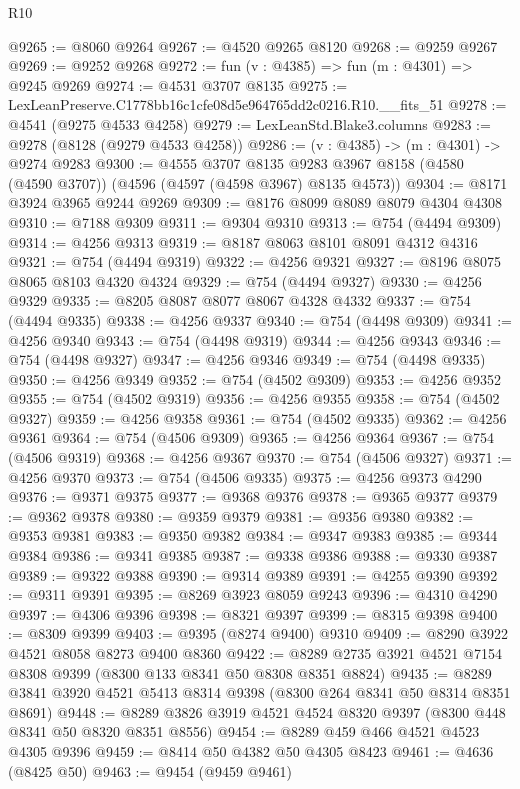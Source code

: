 \begin{lexlean}{R10}
\begin{coremodule}
@9265 := @8060 @9264
@9267 := @4520 @9265 @8120
@9268 := @9259 @9267
@9269 := @9252 @9268
@9272 := fun (v : @4385) => fun (m : @4301) => @9245 @9269
@9274 := @4531 @3707 @8135
@9275 := LexLeanPreserve.C1778bb16c1cfe08d5e964765dd2c0216.R10.__fits_51
@9278 := @4541 (@9275 @4533 @4258)
@9279 := LexLeanStd.Blake3.columns
@9283 := @9278 (@8128 (@9279 @4533 @4258))
@9286 := (v : @4385) -> (m : @4301) -> @9274 @9283
@9300 := @4555
    @3707
    @8135
    @9283
    @3967
    @8158
    (@4580 (@4590 @3707))
    (@4596 (@4597 (@4598 @3967) @8135 @4573))
@9304 := @8171 @3924 @3965 @9244 @9269
@9309 := @8176 @8099 @8089 @8079 @4304 @4308
@9310 := @7188 @9309
@9311 := @9304 @9310
@9313 := @754 (@4494 @9309)
@9314 := @4256 @9313
@9319 := @8187 @8063 @8101 @8091 @4312 @4316
@9321 := @754 (@4494 @9319)
@9322 := @4256 @9321
@9327 := @8196 @8075 @8065 @8103 @4320 @4324
@9329 := @754 (@4494 @9327)
@9330 := @4256 @9329
@9335 := @8205 @8087 @8077 @8067 @4328 @4332
@9337 := @754 (@4494 @9335)
@9338 := @4256 @9337
@9340 := @754 (@4498 @9309)
@9341 := @4256 @9340
@9343 := @754 (@4498 @9319)
@9344 := @4256 @9343
@9346 := @754 (@4498 @9327)
@9347 := @4256 @9346
@9349 := @754 (@4498 @9335)
@9350 := @4256 @9349
@9352 := @754 (@4502 @9309)
@9353 := @4256 @9352
@9355 := @754 (@4502 @9319)
@9356 := @4256 @9355
@9358 := @754 (@4502 @9327)
@9359 := @4256 @9358
@9361 := @754 (@4502 @9335)
@9362 := @4256 @9361
@9364 := @754 (@4506 @9309)
@9365 := @4256 @9364
@9367 := @754 (@4506 @9319)
@9368 := @4256 @9367
@9370 := @754 (@4506 @9327)
@9371 := @4256 @9370
@9373 := @754 (@4506 @9335)
@9375 := @4256 @9373 @4290
@9376 := @9371 @9375
@9377 := @9368 @9376
@9378 := @9365 @9377
@9379 := @9362 @9378
@9380 := @9359 @9379
@9381 := @9356 @9380
@9382 := @9353 @9381
@9383 := @9350 @9382
@9384 := @9347 @9383
@9385 := @9344 @9384
@9386 := @9341 @9385
@9387 := @9338 @9386
@9388 := @9330 @9387
@9389 := @9322 @9388
@9390 := @9314 @9389
@9391 := @4255 @9390
@9392 := @9311 @9391
@9395 := @8269 @3923 @8059 @9243
@9396 := @4310 @4290
@9397 := @4306 @9396
@9398 := @8321 @9397
@9399 := @8315 @9398
@9400 := @8309 @9399
@9403 := @9395 (@8274 @9400) @9310
@9409 := @8290 @3922 @4521 @8058 @8273 @9400 @8360
@9422 := @8289 @2735 @3921 @4521 @7154 @8308 @9399 (@8300 @133 @8341 @50 @8308 @8351 @8824)
@9435 := @8289 @3841 @3920 @4521 @5413 @8314 @9398 (@8300 @264 @8341 @50 @8314 @8351 @8691)
@9448 := @8289 @3826 @3919 @4521 @4524 @8320 @9397 (@8300 @448 @8341 @50 @8320 @8351 @8556)
@9454 := @8289 @459 @466 @4521 @4523 @4305 @9396
@9459 := @8414 @50 @4382 @50 @4305 @8423
@9461 := @4636 (@8425 @50)
@9463 := @9454 (@9459 @9461)

\end{coremodule}
\end{lexlean}
